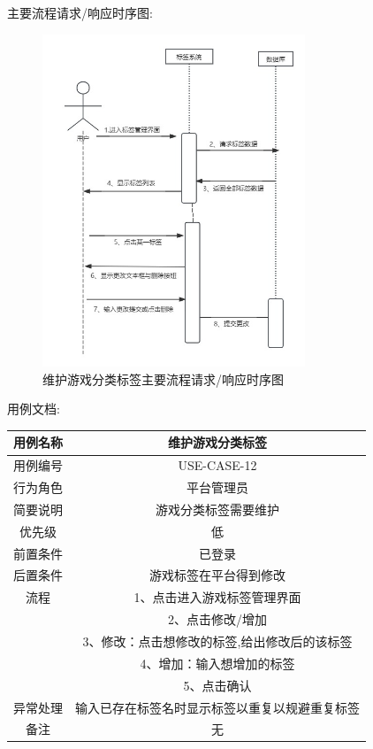 \documentclass[12pt]{ctexart} %
\begin{document}
主要流程请求/响应时序图:
\begin{figure}[h]
  \centering
  \includegraphics[width=0.7\textwidth]{yongli12.jpg}
  \caption{维护游戏分类标签主要流程请求/响应时序图}
\end{figure}
用例文档:

\begin{tabular}{|c|c|}
  \hline
  用例名称& 维护游戏分类标签\\
  \hline
  用例编号 & USE-CASE-12\\
  \hline
  行为角色 & 平台管理员\\
  \hline
  简要说明 & 游戏分类标签需要维护\\
  \hline
  优先级 & 低\\
  \hline
  前置条件 & 已登录\\
  \hline
  后置条件 & 游戏标签在平台得到修改\\
  \hline
  流程 & 1、点击进入游戏标签管理界面\\
      &  2、点击修改/增加\\
      &  3、修改：点击想修改的标签,给出修改后的该标签\\
      &  4、增加：输入想增加的标签\\
      &  5、点击确认\\
  \hline
  异常处理 &  输入已存在标签名时显示标签以重复以规避重复标签\\
  \hline
  备注 & 无\\
  \hline
\end{tabular}
\end{document}
